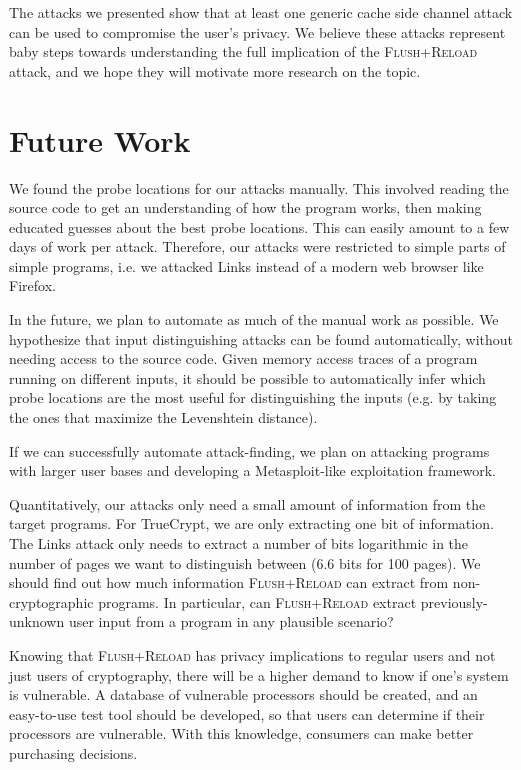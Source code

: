 \documentclass[letterpaper,twocolumn,10pt]{article}
\begin{document}
The attacks we presented show that at least one generic cache side channel
attack can be used to compromise the user's privacy. We believe these attacks
represent baby steps towards understanding the full implication of the
\textsc{Flush+Reload} attack, and we hope they will motivate more research on
the topic.

\section{Future Work}
\label{sec:future}

We found the probe locations for our attacks manually. This involved reading the
source code to get an understanding of how the program works, then making
educated guesses about the best probe locations. This can easily amount to a few
days of work per attack. Therefore, our attacks were restricted to simple parts
of simple programs, i.e. we attacked Links instead of a modern web browser like
Firefox.

In the future, we plan to automate as much of the manual work as possible. We
hypothesize that input distinguishing attacks can be found automatically,
without needing access to the source code. Given memory access traces of
a program running on different inputs, it should be possible to automatically
infer which probe locations are the most useful for distinguishing the inputs
(e.g. by taking the ones that maximize the Levenshtein distance).

If we can successfully automate attack-finding, we plan on attacking programs
with larger user bases and developing a Metasploit-like exploitation framework.

Quantitatively, our attacks only need a small amount of information from the
target programs. For TrueCrypt, we are only extracting one bit of information.
The Links attack only needs to extract a number of bits logarithmic in the
number of pages we want to distinguish between (6.6 bits for 100 pages). We
should find out how much information \textsc{Flush+Reload} can extract from
non-cryptographic programs. In particular, can \textsc{Flush+Reload} extract
previously-unknown user input from a program in any plausible scenario?

Knowing that \textsc{Flush+Reload} has privacy implications to regular users and
not just users of cryptography, there will be a higher demand to know if one's
system is vulnerable. A database of vulnerable processors should be created, and
an easy-to-use test tool should be developed, so that users can determine if
their processors are vulnerable. With this knowledge, consumers can make better
purchasing decisions.
\end{document}

